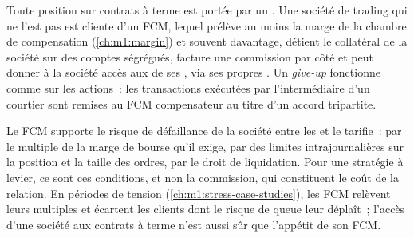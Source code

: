 Toute position sur contrats à terme est portée par un . Une société de trading qui
ne l'est pas est cliente d'un FCM, lequel prélève au moins la
marge de la chambre de compensation (\cref{ch:m1:margin}) et souvent davantage, détient le
collatéral de la société sur des comptes ségrégués, facture une commission par côté et peut
donner à la société accès aux  de ses , via ses propres
. Un \emph{give-up} fonctionne comme sur les actions~: les
transactions exécutées par l'intermédiaire d'un courtier sont remises au FCM compensateur
au titre d'un accord tripartite.

Le FCM supporte le risque de défaillance de la société entre les  et le tarifie~:
par le multiple de la marge de bourse qu'il exige, par des limites intrajournalières sur
la position et la taille des ordres, par le droit de liquidation. Pour une stratégie
à levier, ce sont ces conditions, et non la commission, qui constituent le coût de la relation.
En périodes de tension (\cref{ch:m1:stress-case-studies}), les FCM relèvent leurs
multiples et écartent les clients dont le risque de queue leur déplaît~; l'accès d'une société
aux contrats à terme n'est aussi sûr que l'appétit de son FCM.

